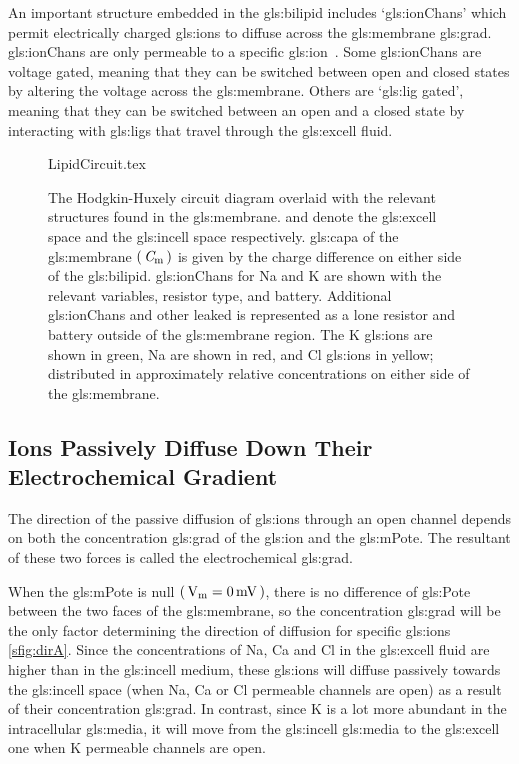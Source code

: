 \documentclass[class={myRUCProject}, crop=false]{standalone}
\begin{document}
An important structure embedded in the \gls{gls:bilipid} includes `\glspl{gls:ionChan}' which permit electrically charged \glspl{gls:ion} to diffuse across the \gls{gls:membrane} \gls{gls:grad}. \Glspl{gls:ionChan} are only permeable to a specific \gls{gls:ion}~\cite{}. Some \glspl{gls:ionChan} are voltage gated, meaning that they can be switched between open and closed states by altering the voltage across the \gls{gls:membrane}. 
Others are `\gls{gls:lig} gated', meaning that they can be switched between an open and a closed state by interacting with \glspl{gls:lig} that travel through the \gls{gls:excell} fluid. 

\vspace{1em}

\begin{figure}[H]
  \centering
  {LipidCircuit.tex}
  \caption{The Hodgkin-Huxely circuit diagram overlaid with the relevant structures found in the \gls{gls:membrane}.  and  denote the \gls{gls:excell} space and the \gls{gls:incell} space respectively. \Gls{gls:capa} of the \gls{gls:membrane} \(\br{\cap\membrane}\) is given by the charge difference on either side of the \gls{gls:bilipid}. \Glspl{gls:ionChan} for \gls{Na} and \gls{K} are shown with the relevant variables, resistor type, and battery. Additional \glspl{gls:ionChan} and other leaked is represented as a lone resistor and battery outside of the \gls{gls:membrane} region. The \gls{K} \glspl{gls:ion} are shown in green, \gls{Na} are shown in red, and \gls{Cl} \glspl{gls:ion} in yellow; distributed in approximately relative concentrations on either side of the \gls{gls:membrane}. }\label{fig:MembraneCircut}
\end{figure}


\subsection{Ions Passively Diffuse Down Their Electrochemical Gradient}
The direction of the passive diffusion of \glspl{gls:ion} through an open channel depends on both the concentration \gls{gls:grad} of the \gls{gls:ion} and the \gls{gls:mPote}. The resultant of these two forces is called the electrochemical \gls{gls:grad}.

When the \gls{gls:mPote} is null \(\br{\unit{\V\membrane}=\qty{0}{\mV}}\), there is no difference of \gls{gls:Pote} between the two faces of the \gls{gls:membrane}, so the concentration \gls{gls:grad} will be the only factor determining the direction of diffusion for specific \glspl{gls:ion} \cref{sfig:dirA}. Since the concentrations of \gls{Na}, \gls{Ca} and \gls{Cl} in the \gls{gls:excell} fluid are higher than in the \gls{gls:incell} medium, these \glspl{gls:ion} will diffuse passively towards the \gls{gls:incell} space (when \gls{Na}, \gls{Ca} or \gls{Cl} permeable channels are open) as a result of their concentration \gls{gls:grad}. In contrast, since \gls{K} is a lot more abundant in the intracellular \gls{gls:media}, it will move from the \gls{gls:incell} \gls{gls:media} to the \gls{gls:excell} one when \gls{K} permeable channels are open. 
\end{document}
